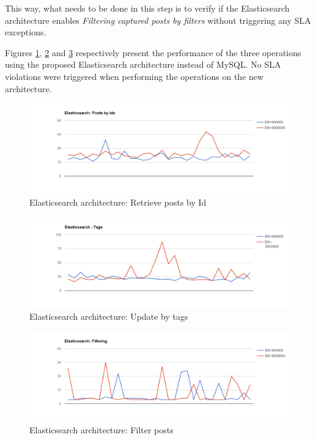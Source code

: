 This way, what needs to be done in this step is to verify if the Elasticsearch architecture enables \textit{Filtering captured posts by filters} without triggering any SLA exceptions.

Figures \ref{fig:retrieve-posts by-id-es}, \ref{fig:search-tags} and \ref{fig:es-filters} respectively present the performance of the three operations using the proposed Elasticsearch architecture instead of MySQL. No SLA violations were triggered when performing the operations on the new architecture.

\begin{figure}[ht!]
	\centering
	\includegraphics[width=150mm]{Imagens/es-posts-by-ids.png}
	\caption{Elasticsearch architecture: Retrieve posts by Id\label{fig:retrieve-posts by-id-es}}
\end{figure}

\begin{figure}[ht!]
	\centering
	\includegraphics[width=150mm]{Imagens/es-search-tags.png}
	\caption{Elasticsearch architecture: Update by tags \label{fig:search-tags}}
\end{figure}

\begin{figure}[ht!]
	\centering
	\includegraphics[width=150mm]{Imagens/es-filters.png}
	\caption{Elasticsearch architecture: Filter posts \label{fig:es-filters}}
\end{figure}

